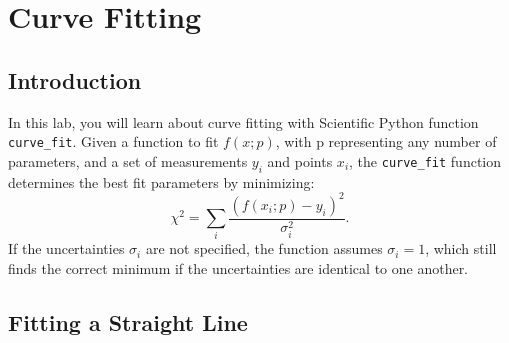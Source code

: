 \chapter{Curve Fitting}



\section{Introduction}

In this lab, you will learn about curve fitting with Scientific Python
function {\tt curve{\_}fit}.  Given a function to fit $f(x;p)$, with p
representing any number of parameters, and a set of measurements $y_i$
and points $x_i$, the {\tt curve{\_}fit} function determines the best
fit parameters by minimizing:
\begin{equation}
\chi^2 = \sum_i \frac{(f(x_i;p) - y_i) ^2}{\sigma_i^2}.
\label{eqn:chi2}
\end{equation}
If the uncertainties $\sigma_i$ are not specified, the function
assumes $\sigma_i = 1$, which still finds the correct minimum
if the uncertainties are identical to one another.

\section{Fitting a Straight Line}

